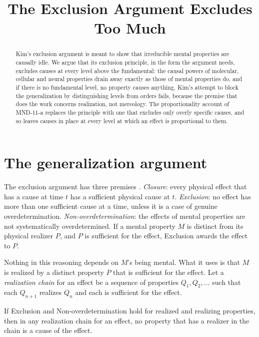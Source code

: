 \documentclass{situationist-preprint}
\title{The Exclusion Argument Excludes Too Much}
\begin{document}
\maketitle

\begin{abstract}
Kim's exclusion argument is meant to show that irreducible mental properties are causally idle. We argue that its exclusion principle, in the form the argument needs, excludes causes at every level above the fundamental: the causal powers of molecular, cellular and neural properties drain away exactly as those of mental properties do, and if there is no fundamental level, no property causes anything. Kim's attempt to block the generalization by distinguishing levels from orders fails, because the premise that does the work concerns realization, not mereology. The proportionality account of MND-11-a replaces the principle with one that excludes only overly specific causes, and so leaves causes in place at every level at which an effect is proportional to them.
\end{abstract}

\section{The generalization argument}

The exclusion argument has three premises \citep{Kim1998,Kim2005}. \emph{Closure}: every physical effect that has a cause at time $t$ has a sufficient physical cause at $t$. \emph{Exclusion}: no effect has more than one sufficient cause at a time, unless it is a case of genuine overdetermination. \emph{Non-overdetermination}: the effects of mental properties are not systematically overdetermined. If a mental property $M$ is distinct from its physical realizer $P$, and $P$ is sufficient for the effect, Exclusion awards the effect to $P$.

Nothing in this reasoning depends on $M$'s being mental. What it uses is that $M$ is realized by a distinct property $P$ that is sufficient for the effect. Let a \emph{realization chain} for an effect be a sequence of properties $Q_1, Q_2, \dots$ such that each $Q_{n+1}$ realizes $Q_n$ and each is sufficient for the effect.

\begin{proposition}\label{p:gen}
If Exclusion and Non-overdetermination hold for realized and realizing properties, then in any realization chain for an effect, no property that has a realizer in the chain is a cause of the effect.
\end{proposition}
\end{document}
